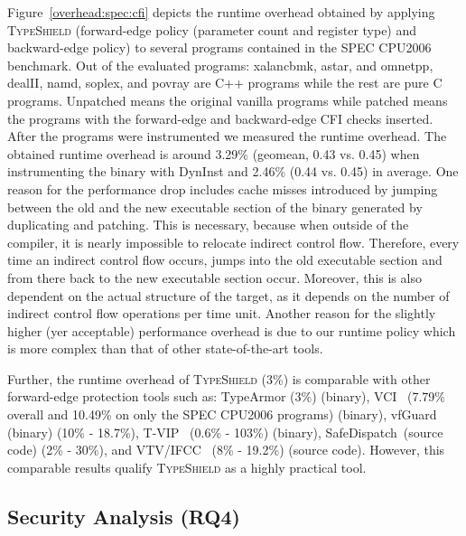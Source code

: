 Figure~\ref{overhead:spec:cfi} depicts the runtime overhead obtained by applying \textsc{TypeShield} (forward-edge policy (parameter count and register type) and backward-edge policy)
to several programs contained in the SPEC CPU2006 benchmark. 
Out of the evaluated programs:
xalancbmk, astar, and omnetpp, dealII, namd, soplex, and povray are C++ programs while the rest are pure C programs. 
Unpatched means the original vanilla programs while patched means the programs with the forward-edge and backward-edge CFI checks inserted.
After the programs were instrumented we measured the runtime overhead.
The obtained runtime overhead is around 3.29\% (geomean,  0.43 vs. 0.45) when instrumenting the binary with DynInst and 2.46\% (0.44 vs. 0.45) in average.
One reason for the performance drop includes cache misses introduced by jumping between the old and the new executable section 
of the binary generated by duplicating and patching. This is necessary, because when
outside of the compiler, it is nearly impossible to relocate indirect control flow. Therefore, 
every time an indirect control flow occurs, jumps into the old executable section and from 
there back to the new executable section occur. Moreover, this is also dependent on the actual structure 
of the target, as it depends on the number of indirect control flow operations per time unit.
Another reason for the slightly higher (yer acceptable) performance overhead is due to our
runtime policy which is more complex than that of other state-of-the-art tools.

Further, the runtime overhead of \textsc{TypeShield} (3\%) is comparable with other forward-edge protection
tools such as: TypeArmor (3\%) (binary), VCI~\cite{vci:asiaccs} (7.79\% overall and 10.49\% on only the SPEC CPU2006 programs) (binary), 
vfGuard~\cite{vfuard:aravind} (binary) (10\% - 18.7\%), T-VIP~\cite{gawlik} (0.6\% - 103\%) (binary), 
SafeDispatch~\cite{safedispatch:jang}(source code) (2\% - 30\%), and VTV/IFCC~\cite{vtv:tice} (8\% - 19.2\%) (source code).
However, this comparable results qualify \textsc{TypeShield} as a highly practical tool.


\subsection{Security Analysis (RQ4)}
\label{RQ5: Security Analysis}
\textit{}

